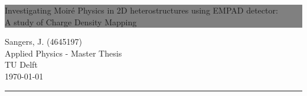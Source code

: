 \begin{titlepage} %
	
	
	\colorbox{grey}{
		\parbox[t]{0.93\textwidth}{ %
			\parbox[t]{0.91\textwidth}{ %
				\raggedleft %
				\fontsize{50pt}{50pt}\selectfont %
				\vspace{0.7cm} %
			    Investigating Moiré Physics in 2D heterostructures using EMPAD detector:\\
				
				
				\fontsize{15pt}{30pt}\selectfont
                A study of Charge Density Mapping
				\vspace{0.7cm} %
			}
		}
	}
	
	\vfill %
	
	
	\parbox[t]{0.93\textwidth}{ %
		\raggedleft %
		\large %
		{\Large  Sangers, J. (4645197)}\\[4pt] %
		Applied Physics - Master Thesis\\
		TU Delft\\
		\today \\[4pt]
		\hfill\rule{0.4\linewidth}{1pt}%
	}
	
\end{titlepage}
